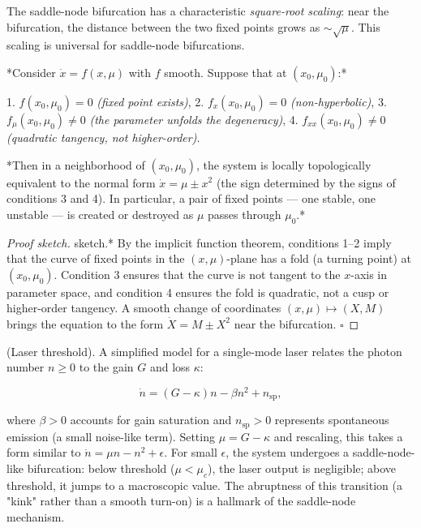 The saddle-node bifurcation has a characteristic \textit{square-root scaling}: near the bifurcation, the distance between the two fixed points grows as $\sim \sqrt{\mu}$. This scaling is universal for saddle-node bifurcations.

\begin{theorem}\label{thm:5.2}
*Consider $\dot{x} = f(x, \mu)$ with $f$ smooth. Suppose that at $(x_0, \mu_0)$:*

1. $f(x_0, \mu_0) = 0$ \textit{(fixed point exists)},
2. $f_x(x_0, \mu_0) = 0$ \textit{(non-hyperbolic)},
3. $f_\mu(x_0, \mu_0) \neq 0$ \textit{(the parameter unfolds the degeneracy)},
4. $f_{xx}(x_0, \mu_0) \neq 0$ \textit{(quadratic tangency, not higher-order)}.

*Then in a neighborhood of $(x_0, \mu_0)$, the system is locally topologically equivalent to the normal form $\dot{x} = \mu \pm x^2$ (the sign determined by the signs of conditions 3 and 4). In particular, a pair of fixed points --- one stable, one unstable --- is created or destroyed as $\mu$ passes through $\mu_0$.*
\end{theorem}


\begin{proof}[Proof sketch]
sketch.* By the implicit function theorem, conditions 1--2 imply that the curve of fixed points in the $(x, \mu)$-plane has a fold (a turning point) at $(x_0, \mu_0)$. Condition 3 ensures that the curve is not tangent to the $x$-axis in parameter space, and condition 4 ensures the fold is quadratic, not a cusp or higher-order tangency. A smooth change of coordinates $(x, \mu) \mapsto (X, M)$ brings the equation to the form $\dot{X} = M \pm X^2$ near the bifurcation. $\square$

\end{proof}

\begin{example}
(Laser threshold). A simplified model for a single-mode laser relates the photon number $n \geq 0$ to the gain $G$ and loss $\kappa$:

\[
\dot{n} = (G - \kappa) n - \beta n^2 + n_{\text{sp}},
\]

where $\beta > 0$ accounts for gain saturation and $n_{\text{sp}} > 0$ represents spontaneous emission (a small noise-like term). Setting $\mu = G - \kappa$ and rescaling, this takes a form similar to $\dot{n} = \mu n - n^2 + \epsilon$. For small $\epsilon$, the system undergoes a saddle-node-like bifurcation: below threshold ($\mu < \mu_c$), the laser output is negligible; above threshold, it jumps to a macroscopic value. The abruptness of this transition (a "kink" rather than a smooth turn-on) is a hallmark of the saddle-node mechanism.
\end{example}


